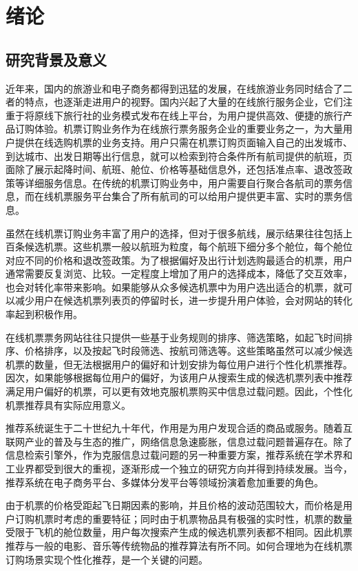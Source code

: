 
\chapter{绪论 }
\label{chap:intro}


\section{研究背景及意义}
近年来，国内的旅游业和电子商务都得到迅猛的发展，在线旅游业务同时结合了二者的特点，也逐渐走进用户的视野。国内兴起了大量的在线旅行服务企业，它们注重于将原线下旅行社的业务模式发布在线上平台，为用户提供高效、便捷的旅行产品订购体验。机票订购业务作为在线旅行票务服务企业的重要业务之一，为大量用户提供在线选购机票的业务支持。用户只需在机票订购页面输入自己的出发城市、到达城市、出发日期等出行信息，就可以检索到符合条件所有航司提供的航班，页面除了展示起降时间、航班、舱位、价格等基础信息外，还包括准点率、退改签政策等详细服务信息。在传统的机票订购业务中，用户需要自行聚合各航司的票务信息，而在线机票服务平台集合了所有航司的可以给用户提供更丰富、实时的票务信息。

虽然在线机票订购业务丰富了用户的选择，但对于很多航线，展示结果往往包括上百条候选机票。这些机票一般以航班为粒度，每个航班下细分多个舱位，每个舱位对应不同的价格和退改签政策。为了根据偏好及出行计划选购最适合的机票，用户通常需要反复浏览、比较。一定程度上增加了用户的选择成本，降低了交互效率，也会对转化率带来影响。如果能够从众多候选机票中为用户选出适合的机票，就可以减少用户在候选机票列表页的停留时长，进一步提升用户体验，会对网站的转化率起到积极作用。

在线机票票务网站往往只提供一些基于业务规则的排序、筛选策略，如起飞时间排序、价格排序，以及按起飞时段筛选、按航司筛选等。这些策略虽然可以减少候选机票的数量，但无法根据用户的偏好和计划安排为每位用户进行个性化机票推荐。因次，如果能够根据每位用户的偏好，为该用户从搜索生成的候选机票列表中推荐满足用户偏好的机票，可以更有效地克服机票购买中信息过载问题。因此，个性化机票推荐具有实际应用意义。

推荐系统\parencite{schafer1999recommender,konstan1997grouplens}诞生于二十世纪九十年代，作用是为用户发现合适的商品或服务。随着互联网产业的普及与生态的推广，网络信息急速膨胀，信息过载问题普遍存在。除了信息检索引擎外，作为克服信息过载问题的另一种重要方案，推荐系统在学术界和工业界都受到很大的重视，逐渐形成一个独立的研究方向并得到持续发展。当今，推荐系统在电子商务平台、多媒体分发平台等领域扮演着愈加重要的角色。

由于机票的价格受距起飞日期因素的影响，并且价格的波动范围较大，而价格是用户订购机票时考虑的重要特征；同时由于机票物品具有极强的实时性，机票的数量受限于飞机的舱位数量，用户每次搜索产生成的候选机票列表都不相同。因此机票推荐与一般的电影、音乐等传统物品的推荐算法有所不同。如何合理地为在线机票订购场景实现个性化推荐，是一个关键的问题。

